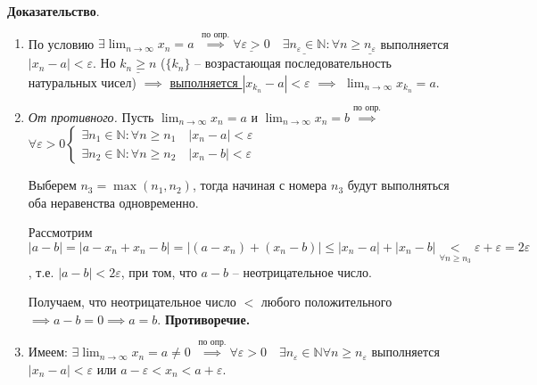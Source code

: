 \documentclass{article}
\newcommand{\bydef}{\stackrel{\text{по опр.}}{\implies}} %
\begin{document}
\textbf{Доказательство}.

\begin{enumerate}
    \item По условию $\exists \displaystyle\lim_{n \to \infty} x_n = a$
    $\bydef \underline{\forall \varepsilon > 0}
    \quad \underline{\exists n_\varepsilon \in \mathbb{N}}: 
    \forall n \ge \underline{n_\varepsilon}$ выполняется 
    $\left| x_n - a \right| < \varepsilon$. Но $\underline{k_n \ge n}$
    ($\{k_n\}$ -- возрастающая последовательность натуральных чисел)
    $\implies$ \underline{выполняется $\left| x_{k_n} - a \right| < \varepsilon$}
    $\implies$ $\displaystyle\lim_{n \to \infty} x_{k_n} = a$.

    \item \textit{От противного.} Пусть $\displaystyle\lim_{n \to \infty} x_n = a$ и
    $\displaystyle\lim_{n \to \infty} x_n = b \bydef$
    $\forall \varepsilon > 0 \begin{cases}
        \exists n_1 \in \mathbb{N}: \forall n \ge n_1 \quad \left| x_n - a \right| < \varepsilon \\
        \exists n_2 \in \mathbb{N}: \forall n \ge n_2 \quad \left| x_n - b \right| < \varepsilon
    \end{cases}$

    Выберем $n_3 = \max \left( n_1, n_2 \right)$, тогда начиная с номера $n_3$ будут выполняться оба
    неравенства одновременно.

    Рассмотрим $\left| a - b \right| = \left| a - x_n + x_n - b \right| = 
    \left| (a - x_n) + (x_n - b) \right| \le \left| x_n - a \right| + 
    \left| x_n - b \right| \underset{\forall n \ge n_3}{<}
    \varepsilon + \varepsilon = 2 \varepsilon$, т.е. $\left| a - b \right| < 2 \varepsilon$,
    при том, что $a - b$ -- неотрицательное число.

    Получаем, что неотрицательное число $<$ любого положительного 
    $\implies a - b = 0 \implies a = b$. \textbf{Противоречие.}

    \item Имеем: $\exists \displaystyle\lim_{n \to \infty} x_n = a \ne 0$
    $\bydef \forall \varepsilon > 0 \quad \exists n_\varepsilon \in \mathbb{N} 
    \forall n \ge n_\varepsilon$ выполняется $\left| x_n - a \right| < \varepsilon$
    или $a - \varepsilon < x_n < a + \varepsilon$.
    

\end{enumerate}
\end{document}
